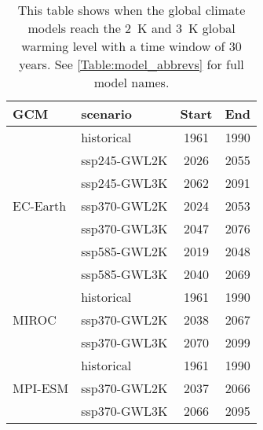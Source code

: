 \begin{table}[!htbp]
\centering
\caption{This table shows when the global climate models reach the \qty{2}{\kelvin} and \qty{3}{\kelvin} global warming level with a time window of 30 years. See \autoref{Table:model_abbrevs} for full model names.}
\label{Table:GWL}
\begin{tabular}{|l|l|c|c|}
\toprule
GCM & scenario & Start & End \\
\midrule
\multirow{7}{*}{EC-Earth} & historical & 1961 & 1990\\
 &  ssp245-GWL2K & 2026 & 2055\\
 &  ssp245-GWL3K & 2062 & 2091\\
 &  ssp370-GWL2K & 2024 & 2053\\
 &  ssp370-GWL3K & 2047 & 2076\\
 &  ssp585-GWL2K & 2019 & 2048\\
 &  ssp585-GWL3K & 2040 & 2069\\
\cmidrule(lr){1-4}
\multirow{3}{*}{MIROC} & historical & 1961 & 1990\\
 &  ssp370-GWL2K & 2038 & 2067\\
 &  ssp370-GWL3K & 2070 & 2099\\
\cmidrule(lr){1-4}
\multirow{3}{*}{MPI-ESM} & historical & 1961 & 1990\\
 &  ssp370-GWL2K & 2037 & 2066\\
 &  ssp370-GWL3K & 2066 & 2095\\
\bottomrule
\end{tabular}
\end{table}
